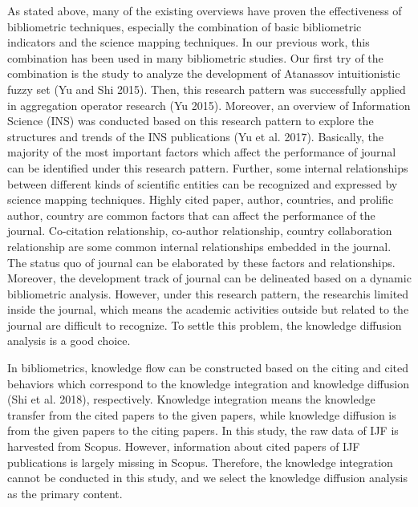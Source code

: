 \documentclass[11pt,a4paper]{elsarticle} %
\begin{document}
As stated above, many of the existing overviews have proven the
effectiveness of bibliometric techniques, especially the combination of
basic bibliometric indicators and the science mapping techniques. In our
previous work, this combination has been used in many bibliometric
studies. Our first try of the combination is the study to analyze the
development of Atanassov intuitionistic fuzzy set (Yu and Shi 2015).
Then, this research pattern was successfully applied in aggregation
operator research (Yu 2015). Moreover, an overview of Information
Science (INS) was conducted based on this research pattern to explore
the structures and trends of the INS publications (Yu et al. 2017).
Basically, the majority of the most important factors which affect the
performance of journal can be identified under this research pattern.
Further, some internal relationships between different kinds of
scientific entities can be recognized and expressed by science mapping
techniques. Highly cited paper, author, countries, and prolific author,
country are common factors that can affect the performance of the
journal. Co-citation relationship, co-author relationship, country
collaboration relationship are some common internal relationships
embedded in the journal. The status quo of journal can be elaborated by
these factors and relationships. Moreover, the development track of
journal can be delineated based on a dynamic bibliometric analysis.
However, under this research pattern, the researchis limited inside the
journal, which means the academic activities outside but related to the
journal are difficult to recognize. To settle this problem, the
knowledge diffusion analysis is a good choice.

In bibliometrics, knowledge flow can be constructed based on the citing
and cited behaviors which correspond to the knowledge integration and
knowledge diffusion (Shi et al. 2018), respectively. Knowledge
integration means the knowledge transfer from the cited papers to the
given papers, while knowledge diffusion is from the given papers to the
citing papers. In this study, the raw data of IJF is harvested from
Scopus. However, information about cited papers of IJF publications is
largely missing in Scopus. Therefore, the knowledge integration cannot
be conducted in this study, and we select the knowledge diffusion
analysis as the primary content.
\end{document}
